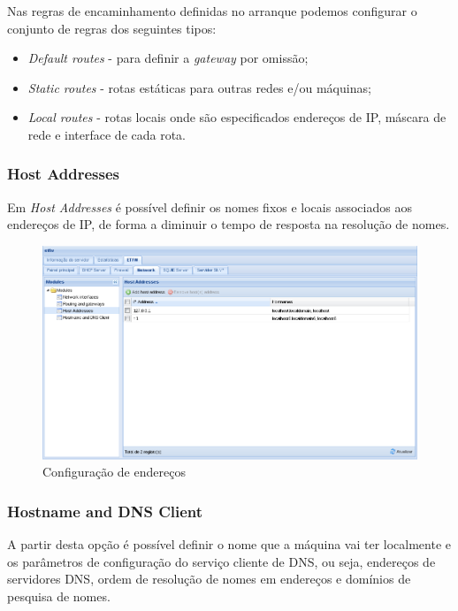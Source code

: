 Nas regras de encaminhamento definidas no arranque podemos configurar o conjunto de regras dos seguintes tipos:

\begin{itemize}
    \item \textit{Default routes} - para definir a \textit{gateway} por omissão;
    \item \textit{Static routes} - rotas estáticas para outras redes e/ou máquinas;
    \item \textit{Local routes} - rotas locais onde são especificados endereços de IP, máscara de rede e interface de cada rota.
\end{itemize}

\subsubsection{Host Addresses}

Em \textit{Host Addresses} é possível definir os nomes fixos e locais associados aos endereços de IP, de forma a diminuir o tempo de resposta na resolução de nomes.

\begin{figure}[H]
    \begin{center}
    \includegraphics[scale=0.38]{screenshots/etfw/etfw_network_hostaddresses_01.png}
    \caption{Configuração de endereços}
    \label{fig:etfw_network_hostaddresses_01}
    \end{center}
\end{figure}

\subsubsection{Hostname and DNS Client}

A partir desta opção é possível definir o nome que a máquina vai ter localmente e os parâmetros de configuração do serviço cliente de DNS, ou seja, endereços de servidores DNS, ordem de resolução de nomes em endereços e domínios de pesquisa de nomes.

